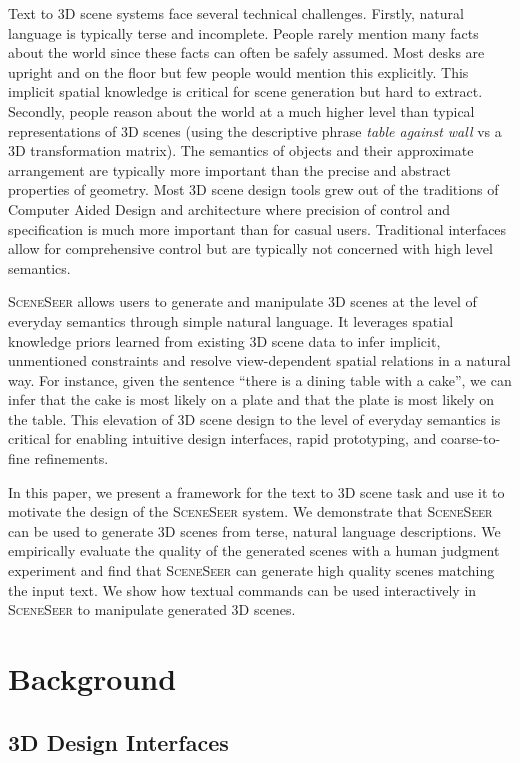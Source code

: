 \documentclass{sigchi}
\newcommand{\SceneSeer}{\textsc{SceneSeer}\xspace}
\begin{document}
Text to 3D scene systems face several technical challenges.  Firstly, natural language is typically terse and incomplete.  People rarely mention many facts about the world since these facts can often be safely assumed.  Most desks are upright and on the floor but few people would mention this explicitly.  This implicit spatial knowledge is critical for scene generation but hard to extract.  Secondly, people reason about the world at a much higher level than typical representations of 3D scenes (using the descriptive phrase \emph{table against wall} vs a 3D transformation matrix).  The semantics of objects and their approximate arrangement are typically more important than the precise and abstract properties of geometry.  Most 3D scene design tools grew out of the traditions of Computer Aided Design and architecture where precision of control and specification is much more important than for casual users.  Traditional interfaces allow for comprehensive control but are typically not concerned with high level semantics.

\SceneSeer allows users to generate and manipulate 3D scenes at the level of everyday semantics through simple natural language. It leverages spatial knowledge priors learned from existing 3D scene data to infer implicit, unmentioned constraints and resolve view-dependent spatial relations in a natural way.  For instance, given the sentence ``there is a dining table with a cake'', we can infer that the cake is most likely on a plate and that the plate is most likely on the table.  This elevation of 3D scene design to the level of everyday semantics is critical for enabling intuitive design interfaces, rapid prototyping, and coarse-to-fine refinements.

In this paper, we present a framework for the text to 3D scene task and use it to motivate the design of the \SceneSeer system.  We demonstrate that \SceneSeer can be used to generate 3D scenes from terse, natural language descriptions.  We empirically evaluate the quality of the generated scenes with a human judgment experiment and find that \SceneSeer can generate high quality scenes matching the input text.  We show how textual commands can be used interactively in \SceneSeer to manipulate generated 3D scenes.


\section{Background}

\subsection{3D Design Interfaces}
\end{document}
